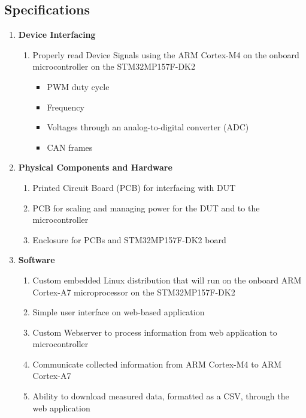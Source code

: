 \documentclass[12pt]{article}
\begin{document}
\subsection{Specifications}
\begin{enumerate}[label=\arabic*.]
  \item \textbf{Device Interfacing}
    \begin{enumerate}[label=\theenumi\arabic*]
      \item Properly read Device Signals using the ARM Cortex-M4 on the onboard 
        microcontroller on the STM32MP157F-DK2
        \begin{itemize}
          \item PWM duty cycle
          \item Frequency
          \item Voltages through an analog-to-digital converter (ADC)
          \item CAN frames
        \end{itemize}
    \end{enumerate}

  \item \textbf{Physical Components and Hardware}
    \begin{enumerate}[label=\theenumi\arabic*]
      \item Printed Circuit Board (PCB) for interfacing with DUT
      \item PCB for scaling and managing power for the DUT and to the 
        microcontroller
      \item Enclosure for PCBs and STM32MP157F-DK2 board
    \end{enumerate}

  \item \textbf{Software}
    \begin{enumerate}[label=\theenumi\arabic*]
      \item Custom embedded Linux distribution that will run on the onboard ARM 
        Cortex-A7 microprocessor on the STM32MP157F-DK2
      \item Simple user interface on web-based application
      \item Custom Webserver to process information from web application to 
        microcontroller
      \item Communicate collected information from ARM Cortex-M4 to ARM 
        Cortex-A7
      \item Ability to download measured data, formatted as a CSV, through the 
        web application
    \end{enumerate}
\end{enumerate}
\end{document}
